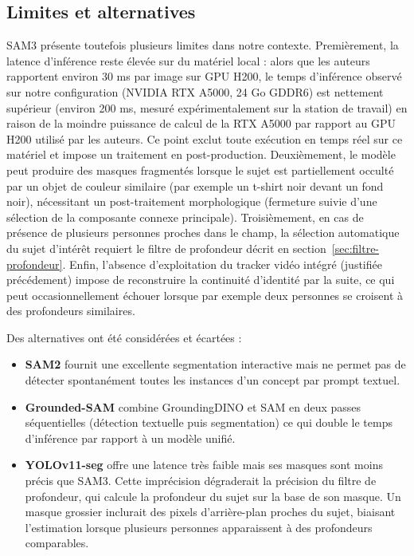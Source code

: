 \subsection{Limites et alternatives}

SAM3 présente toutefois plusieurs limites dans notre contexte. Premièrement, la latence d'inférence reste élevée sur du matériel local : alors que les auteurs rapportent environ 30 ms par image sur GPU H200, le temps d'inférence observé sur notre configuration (NVIDIA RTX
A5000, 24 Go GDDR6) est nettement supérieur (environ 200 ms, mesuré expérimentalement sur la station de travail) en raison de la moindre puissance de calcul de la RTX A5000 par rapport au GPU H200 utilisé par les auteurs. Ce point exclut toute exécution en temps réel sur ce matériel et impose un traitement en post-production. Deuxièmement, le modèle peut produire des masques fragmentés lorsque le sujet est partiellement occulté par un objet de couleur similaire (par exemple un t-shirt noir devant un fond noir), nécessitant un post-traitement morphologique (fermeture suivie d'une sélection de la composante connexe principale). Troisièmement, en cas de présence de plusieurs personnes proches dans le champ, la sélection automatique du sujet d'intérêt requiert le filtre de profondeur décrit en section~\ref{sec:filtre-profondeur}. Enfin, l'absence d'exploitation du tracker vidéo intégré (justifiée précédement) impose de reconstruire la continuité d'identité par la suite, ce qui peut occasionnellement échouer lorsque par exemple deux personnes se croisent à des profondeurs similaires.

Des alternatives ont été considérées et écartées :
\begin{itemize}
  \item \textbf{SAM2} fournit une excellente segmentation interactive mais ne permet pas de détecter spontanément toutes les instances d'un concept par prompt textuel.
  \item \textbf{Grounded-SAM} combine GroundingDINO et SAM en deux passes séquentielles (détection textuelle puis segmentation) ce qui double le temps d'inférence par rapport à un modèle unifié.
  \item \textbf{YOLOv11-seg} offre une latence très faible mais ses masques sont moins précis que SAM3. Cette imprécision dégraderait la précision du filtre de profondeur, qui calcule la profondeur du sujet sur la base de son masque. Un masque grossier inclurait des pixels d'arrière-plan proches du sujet, biaisant l'estimation lorsque plusieurs personnes apparaissent à des profondeurs comparables.
\end{itemize}

